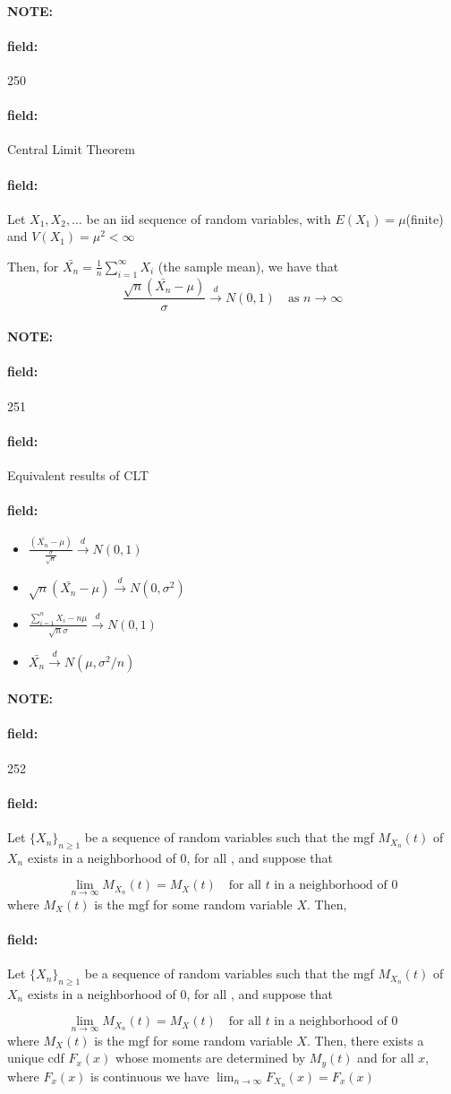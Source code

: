 \documentclass[12pt]{article}
\newenvironment{note}{\paragraph{NOTE:}}{}
\newenvironment{field}{\paragraph{field:}}{}
\begin{document}
\begin{note} \begin{field} \tiny 250 \end{field}
  \begin{field}
    Central Limit Theorem
  \end{field}
  \begin{field}
    Let $X_1, X_2, \ldots$ be an iid sequence of random variables, with $E(X_1) = \mu$(finite) and $V(X_1) = \mu^2 < \infty$

    Then, for $\bar{X_n} = \frac{1}{n }\sum_{i = 1}^\infty X_i$ (the sample mean), we have that
    $$ \frac{\sqrt{n}(\bar{X_n} - \mu)}{\sigma} \overset{d}{\to} N(0,1) \quad \text{as } n \to
    \infty$$
  \end{field}
\end{note}

\begin{note} \begin{field} \tiny 251 \end{field}
  \begin{field}
    Equivalent results of CLT
  \end{field}
  \begin{field}
    \begin{itemize}
      \item $\frac{(\bar{X_n} - \mu)}{\frac{\sigma}{\sqrt{n}}} \overset{d}{\to}N(0,1)$
      \item $\sqrt{n}(\bar{X_n} - \mu) \overset{d}{\to} N(0,\sigma^2)$
      \item $\frac{\sum_{i=1}^n X_i - n\mu}{\sqrt{n}\sigma} \overset{d}{\to}N(0,1)$
      \item $\bar{X_n} \overset{d}{\to} N(\mu, \sigma^2/n)$
    \end{itemize}
  \end{field}
\end{note}


\begin{note} \begin{field} \tiny 252 \end{field}
  \begin{field}
    Let $\{X_n\}_{n \geq 1}$ be a sequence of random variables such that the mgf $M_{X_n}(t)$ of $X_n$ exists in a neighborhood of 0, for all , and suppose that

    $$ \lim_{n \to \infty} M_{X_n}(t) = M_X(t) \quad \text{for all } t \text{ in a neighborhood of }0$$
    where $M_X(t)$ is the mgf for some random variable $X$. Then,
  \end{field}
  \begin{field}
    Let $\{X_n\}_{n \geq 1}$ be a sequence of random variables such that the mgf $M_{X_n}(t)$ of $X_n$ exists in a neighborhood of 0, for all , and suppose that

    $$ \lim_{n \to \infty} M_{X_n}(t) = M_X(t) \quad \text{for all } t \text{ in a neighborhood of }0$$
    where $M_X(t)$ is the mgf for some random variable $X$. Then, there exists a unique cdf $F_x(x)$ whose moments are determined by $M_y(t)$ and for all $x$, where $F_x(x)$ is continuous we have $\lim_{n \to \infty} F_{X_n}(x) = F_x(x)$
  \end{field}
\end{note}
\end{document}
